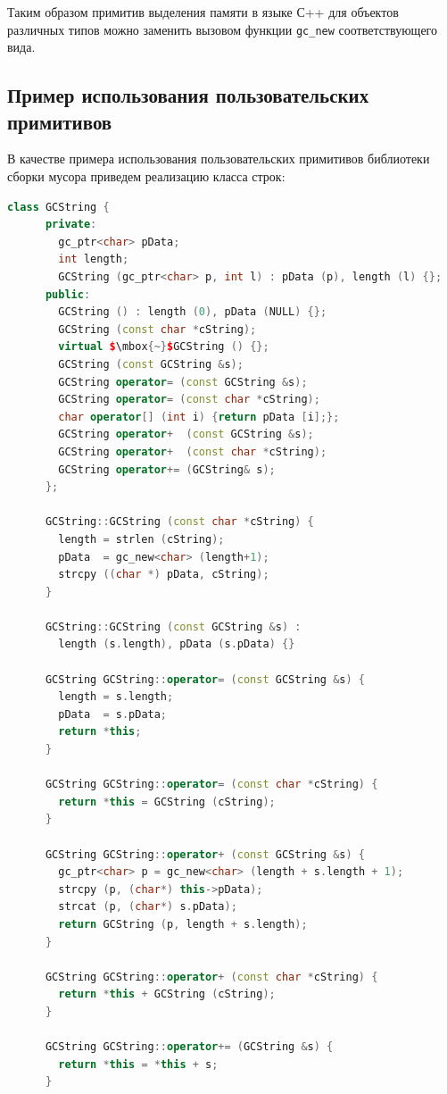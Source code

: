 Таким образом примитив выделения памяти в языке С++ для объектов различных типов можно заменить вызовом функции \lstinline{gc_new} 
соответствующего вида.

\subsection{Пример использования пользовательских\\
примитивов}

В качестве примера использования пользовательских примитивов библиотеки сборки мусора приведем 
реализацию класса строк:

\begin{lstlisting}[mathescape=true,language=C++]
    class GCString {
      private:
        gc_ptr<char> pData; 	
        int length;	 
        GCString (gc_ptr<char> p, int l) : pData (p), length (l) {};     
      public:
        GCString () : length (0), pData (NULL) {};
        GCString (const char *cString);
        virtual $\mbox{~}$GCString () {};
        GCString (const GCString &s);
        GCString operator= (const GCString &s);
        GCString operator= (const char *cString);
        char operator[] (int i) {return pData [i];};
        GCString operator+  (const GCString &s);
        GCString operator+  (const char *cString);
        GCString operator+= (GCString& s);
      };

      GCString::GCString (const char *cString) {
        length = strlen (cString);
        pData  = gc_new<char> (length+1);
        strcpy ((char *) pData, cString);
      }

      GCString::GCString (const GCString &s) : 
        length (s.length), pData (s.pData) {}

      GCString GCString::operator= (const GCString &s) {
        length = s.length;
        pData  = s.pData;
        return *this;
      }

      GCString GCString::operator= (const char *cString) {
        return *this = GCString (cString);
      }

      GCString GCString::operator+ (const GCString &s) {
        gc_ptr<char> p = gc_new<char> (length + s.length + 1);
        strcpy (p, (char*) this->pData);
        strcat (p, (char*) s.pData);
        return GCString (p, length + s.length);
      }

      GCString GCString::operator+ (const char *cString) {
        return *this + GCString (cString);
      }

      GCString GCString::operator+= (GCString &s) {
        return *this = *this + s;
      }
\end{lstlisting}

